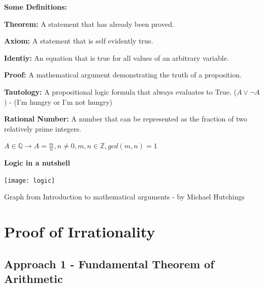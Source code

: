 \documentclass{article}
\begin{document}
\hrulefill

\hspace{1cm}

\textbf{ Some Definitions:}

\textbf{Theorem:} A statement that has already been proved.

\textbf{Axiom:} A statement that is self evidently true.

\textbf{Identiy:} An equation that is true for all values of an arbitrary variable.

\textbf{Proof:} A mathematical argument demonstrating the truth of a proposition.

\textbf{Tautology:} A propositional logic formula that always evaluates to True. ($A \lor \neg A$) - (I'm hungry or I'm not hungry)

\textbf{Rational Number:} A number that can be represented as the fraction of two relatively prime integers.

\centerline{$A \in \mathbb Q \rightarrow A = \frac{m}{n}, n\neq 0,  m, n \in \mathbb Z, gcd(m,n) = 1$}

\pagebreak

\text{}

\vspace{3cm}

\begin{center}

\textbf{Logic in a nutshell}

\texttt{[image: logic]}

\begin{flushright}

{\scriptsize Graph from Introduction to mathematical arguments - by Michael Hutchings}

\end{flushright}

\end{center}

\pagebreak

\text{}

\section{Proof of Irrationality}

\subsection{Approach 1 - Fundamental Theorem of Arithmetic}
\end{document}
